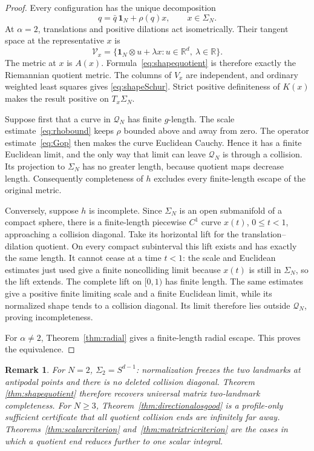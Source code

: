 \documentclass[11pt]{article}
\newtheorem{remark}{Remark}
\newcommand{\R}{\mathbb{R}}
\newcommand{\Q}{\mathcal{Q}}
\newcommand{\one}{\mathbf{1}}
\newcommand{\kron}{\mathbin{\otimes}}
\begin{document}
\begin{proof}
Every configuration has the unique decomposition
\[
 q=\bar q\,\one_N+\rho(q)x,\qquad x\in\Sigma_N.
\]
At \(\alpha=2\), translations and positive dilations act isometrically.
Their tangent space at the representative \(x\) is
\[
 \mathcal V_x
 =\{\one_N\kron u+\lambda x:u\in\R^d,\ \lambda\in\R\}.
\]
The metric at \(x\) is \(A(x)\).  Formula~\eqref{eq:shapequotient} is
therefore exactly the Riemannian quotient metric.  The columns of \(V_x\)
are independent, and ordinary weighted least squares gives
\eqref{eq:shapeSchur}.  Strict positive definiteness of \(K(x)\) makes the
result positive on \(T_x\Sigma_N\).

Suppose first that a curve in \(\Q_N\) has finite \(g\)-length.  The scale
estimate~\eqref{eq:rhobound} keeps \(\rho\) bounded above and away from zero.
The operator estimate~\eqref{eq:Gop} then makes the curve Euclidean
Cauchy.  Hence it has a finite Euclidean limit, and the only way that limit
can leave \(\Q_N\) is through a collision.  Its projection to
\(\Sigma_N\) has no greater length, because quotient maps decrease length.
Consequently completeness of \(h\) excludes every finite-length escape of
the original metric.

Conversely, suppose \(h\) is incomplete.  Since \(\Sigma_N\) is an open
submanifold of a compact sphere, there is a finite-length piecewise \(C^1\)
curve \(x(t)\), \(0\le t<1\), approaching a collision diagonal.  Take its
horizontal lift for the translation--dilation quotient.  On every compact
subinterval this lift exists and has exactly the same length.  It cannot
cease at a time \(t<1\): the scale and Euclidean estimates just used give a
finite noncolliding limit because \(x(t)\) is still in \(\Sigma_N\), so the
lift extends.  The complete lift on \([0,1)\) has finite length.  The same
estimates give a positive finite limiting scale and a finite Euclidean
limit, while its normalized shape tends to a collision diagonal.  Its limit
therefore lies outside \(\Q_N\), proving incompleteness.

For \(\alpha\ne2\), Theorem~\ref{thm:radial} gives a finite-length radial
escape.  This proves the equivalence.
\end{proof}

\begin{remark}
For \(N=2\), \(\Sigma_2=S^{d-1}\): normalization freezes the two landmarks
at antipodal points and there is no deleted collision diagonal.  Theorem
\ref{thm:shapequotient} therefore recovers universal matrix two-landmark
completeness.  For \(N\ge3\), Theorem~\ref{thm:directionalosgood} is a
profile-only sufficient certificate that all quotient collision ends are
infinitely far away.  Theorems~\ref{thm:scalarcriterion}
and~\ref{thm:matrixtricriterion} are the cases in which a quotient end
reduces further to one scalar integral.
\end{remark}
\end{document}
